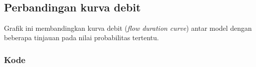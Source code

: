\documentclass[11pt]{article}
\begin{document}
    \begin{center}
    \end{center}
    { \hspace*{\fill} \\}
    
    \hypertarget{perbandingan-kurva-debit}{%
\subsection{Perbandingan kurva debit}\label{perbandingan-kurva-debit}}

Grafik ini membandingkan kurva debit (\emph{flow duration curve}) antar
model dengan beberapa tinjauan pada nilai probabilitas tertentu.

    \hypertarget{kode}{%
\subsubsection{Kode}\label{kode}}
\end{document}

